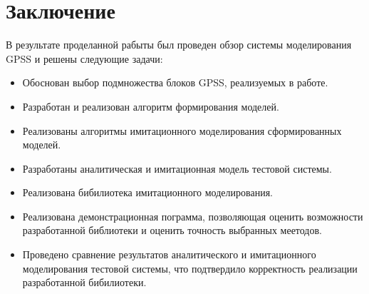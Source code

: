 \chapter{Заключение}

В результате проделанной рабыты был проведен обзор системы моделирования GPSS и решены следующие задачи:

\begin{itemize}
\item Обоснован выбор подмножества блоков GPSS, реализуемых в работе.
\item Разработан и реализован алгоритм формирования моделей.
\item Реализованы алгоритмы имитационного моделирования сформированных моделей.
\item Разработаны аналитическая и имитационная модель тестовой системы.
\item Реализована бибилиотека имитационного моделирования.
\item Реализована демонстрационная пограмма, позволяющая оценить возможности разработанной библиотеки и оценить точность выбранных меетодов.
\item Проведено сравнение результатов аналитического и имитационного моделирования тестовой системы, что подтвердило корректность реализации разработанной бибилиотеки.


\end{itemize}
